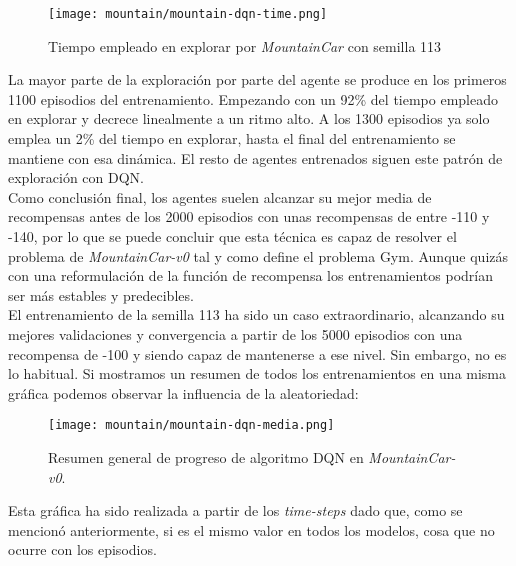 \documentclass[11pt,fleqn]{book} %
\begin{document}
\begin{figure}[H]
	\centering\texttt{[image: mountain/mountain-dqn-time.png]}
	\caption{Tiempo empleado en explorar por \textit{MountainCar} con semilla 113}
	\label{fig:mountainDQNtime} %
\end{figure} 

La mayor parte de la exploración por parte del agente se produce en los primeros 1100 episodios del entrenamiento. Empezando con un 92\% del tiempo empleado en explorar y decrece linealmente a un ritmo alto. A los 1300 episodios ya solo emplea un 2\% del tiempo en explorar, hasta el final del entrenamiento se mantiene con esa dinámica. El resto de agentes entrenados siguen este patrón de exploración con DQN. \\

Como conclusión final, los agentes suelen alcanzar su mejor media de recompensas antes de los 2000 episodios con unas recompensas de entre -110 y -140, por lo que se puede concluir que esta técnica es capaz de resolver el problema de \textit{MountainCar-v0} tal y como define el problema Gym. Aunque quizás con una reformulación de la función de recompensa los entrenamientos podrían ser más estables y predecibles. \\

El entrenamiento de la semilla 113 ha sido un caso extraordinario, alcanzando su mejores validaciones y convergencia a partir de los 5000 episodios con una recompensa de -100 y siendo capaz de mantenerse a ese nivel. Sin embargo, no es lo habitual. Si mostramos un resumen de todos los entrenamientos en una misma gráfica podemos observar la influencia de la aleatoriedad:

\begin{figure}[H]
	\centering\texttt{[image: mountain/mountain-dqn-media.png]}
	\caption{Resumen general de progreso de algoritmo DQN en \textit{MountainCar-v0}.}
	\label{fig:mountainDQNmedia} %
\end{figure} 

Esta gráfica ha sido realizada a partir de los \textit{time-steps} dado que, como se mencionó anteriormente, si es el mismo valor en todos los modelos, cosa que no ocurre con los episodios. \\
\end{document}
